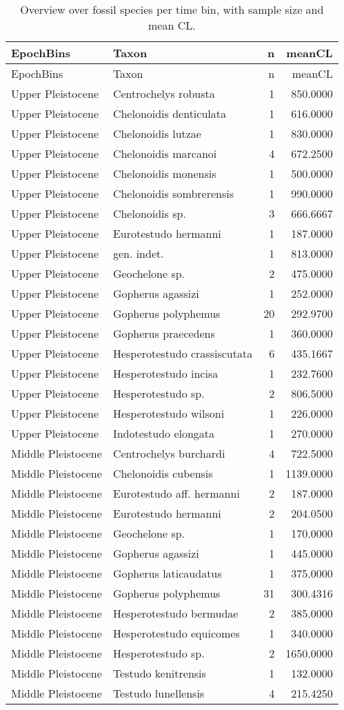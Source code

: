 \begin{longtable}[]{@{}llrr@{}}
	\caption[Species per time bins]{Overview over fossil species per time bin, with sample size and
		mean CL.}
	\label{tab:SpecBins}\tabularnewline
	\toprule
	EpochBins & Taxon & n & meanCL\tabularnewline
	\midrule
	\endfirsthead
	\toprule
	EpochBins & Taxon & n & meanCL\tabularnewline
	\midrule
	\endhead
	Upper Pleistocene & Centrochelys robusta & 1 & 850.0000\tabularnewline
	Upper Pleistocene & Chelonoidis denticulata & 1 &
	616.0000\tabularnewline
	Upper Pleistocene & Chelonoidis lutzae & 1 & 830.0000\tabularnewline
	Upper Pleistocene & Chelonoidis marcanoi & 4 & 672.2500\tabularnewline
	Upper Pleistocene & Chelonoidis monensis & 1 & 500.0000\tabularnewline
	Upper Pleistocene & Chelonoidis sombrerensis & 1 &
	990.0000\tabularnewline
	Upper Pleistocene & Chelonoidis sp. & 3 & 666.6667\tabularnewline
	Upper Pleistocene & Eurotestudo hermanni & 1 & 187.0000\tabularnewline
	Upper Pleistocene & gen. indet. & 1 & 813.0000\tabularnewline
	Upper Pleistocene & Geochelone sp. & 2 & 475.0000\tabularnewline
	Upper Pleistocene & Gopherus agassizi & 1 & 252.0000\tabularnewline
	Upper Pleistocene & Gopherus polyphemus & 20 & 292.9700\tabularnewline
	Upper Pleistocene & Gopherus praecedens & 1 & 360.0000\tabularnewline
	Upper Pleistocene & Hesperotestudo crassiscutata & 6 &
	435.1667\tabularnewline
	Upper Pleistocene & Hesperotestudo incisa & 1 & 232.7600\tabularnewline
	Upper Pleistocene & Hesperotestudo sp. & 2 & 806.5000\tabularnewline
	Upper Pleistocene & Hesperotestudo wilsoni & 1 & 226.0000\tabularnewline
	Upper Pleistocene & Indotestudo elongata & 1 & 270.0000\tabularnewline
	Middle Pleistocene & Centrochelys burchardi & 4 &
	722.5000\tabularnewline
	Middle Pleistocene & Chelonoidis cubensis & 1 & 1139.0000\tabularnewline
	Middle Pleistocene & Eurotestudo aff. hermanni & 2 &
	187.0000\tabularnewline
	Middle Pleistocene & Eurotestudo hermanni & 2 & 204.0500\tabularnewline
	Middle Pleistocene & Geochelone sp. & 1 & 170.0000\tabularnewline
	Middle Pleistocene & Gopherus agassizi & 1 & 445.0000\tabularnewline
	Middle Pleistocene & Gopherus laticaudatus & 1 & 375.0000\tabularnewline
	Middle Pleistocene & Gopherus polyphemus & 31 & 300.4316\tabularnewline
	Middle Pleistocene & Hesperotestudo bermudae & 2 &
	385.0000\tabularnewline
	Middle Pleistocene & Hesperotestudo equicomes & 1 &
	340.0000\tabularnewline
	Middle Pleistocene & Hesperotestudo sp. & 2 & 1650.0000\tabularnewline
	Middle Pleistocene & Testudo kenitrensis & 1 & 132.0000\tabularnewline
	Middle Pleistocene & Testudo lunellensis & 4 & 215.4250\tabularnewline

\end{longtable}

